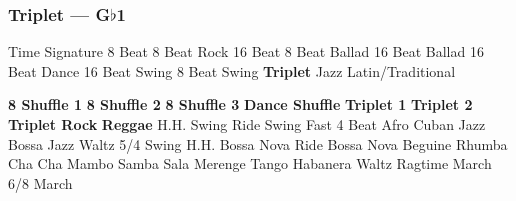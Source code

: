 \subsubsection[Triplet]{Triplet --- \UiKey{\II}\UiKey{\MET}G$\flat$1}
Time Signature
8 Beat
8 Beat Rock
16 Beat
8 Beat Ballad
16 Beat Ballad
16 Beat Dance
16 Beat Swing
8 Beat Swing
\textbf{Triplet}
Jazz
Latin/Traditional





























\textbf{8 Shuffle 1}
\textbf{8 Shuffle 2}
\textbf{8 Shuffle 3}
\textbf{Dance Shuffle}
\textbf{Triplet 1}
\textbf{Triplet 2}
\textbf{Triplet Rock}
\textbf{Reggae}
H.H. Swing
Ride Swing
Fast 4 Beat
Afro Cuban
Jazz Bossa
Jazz Waltz
5/4 Swing
H.H. Bossa Nova
Ride Bossa Nova
Beguine
Rhumba
Cha Cha
Mambo
Samba
Sala
Merenge
Tango
Habanera
Waltz
Ragtime
March
6/8 March
